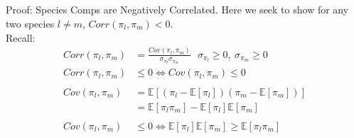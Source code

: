 \documentclass[ xcolor = pdftex, dvipsnames, table ]{beamer}
\begin{document}
%
%

%
\subsection{}
\begin{frame}{Proof: Species Comps are Negatively Correlated.}
	Here we seek to show for any two species $l\neq m$, $Corr(\pi_{l}, \pi_{m})<0$.\\
	Recall:
	\begin{align*}
		Corr(\pi_{l}, \pi_{m}) &= \frac{Cov(\pi_{l}, \pi_{m})}{\sigma_{\pi_{l}}\sigma_{\pi_{m}}} ~~~ \sigma_{\pi_{l}}\ge0,~ \sigma_{\pi_{m}}\ge0 \nonumber\\
		Corr(\pi_{l}, \pi_{m}) &\le 0 \iff Cov(\pi_{l}, \pi_{m}) \le 0 \nonumber\\\nonumber\\
		Cov(\pi_{l}, \pi_{m}) &= \mathbb{E}[(\pi_{l}-\mathbb{E}[\pi_{l}])(\pi_{m}-\mathbb{E}[\pi_{m}])] \nonumber\\ 
		&= \mathbb{E}[\pi_{l}\pi_{m}] - \mathbb{E}[\pi_{l}]\mathbb{E}[\pi_{m}] \nonumber\\\nonumber\\
		Cov(\pi_{l}, \pi_{m}) &\le0 \iff \mathbb{E}[\pi_{l}]\mathbb{E}[\pi_{m}] \ge \mathbb{E}[\pi_{l}\pi_{m}]
	\end{align*}
\end{frame}

%
%
\end{document}
